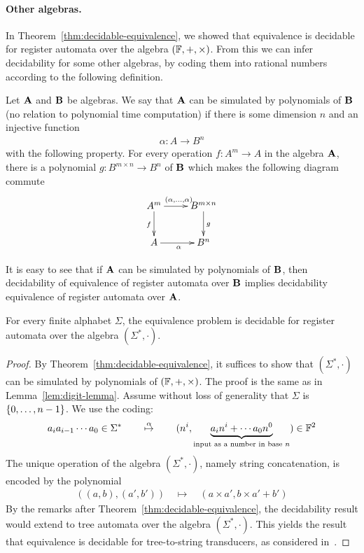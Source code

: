 \paragraph*{Other algebras.} In Theorem~\ref{thm:decidable-equivalence}, we showed that equivalence is decidable for register automata over the algebra $(\mathbb F,+,\times)$. From this we can infer decidability for  some other algebras, by coding them into rational numbers according to the following definition.

\begin{definition}
	Let $\mathbf A$ and $\mathbf B$ be algebras. We say that $\mathbf A$ can be  simulated  by polynomials of   $\mathbf B$ (no relation to polynomial time computation) if there is some dimension $n$ and an injective function
	\begin{align*}
  \alpha : A \to B^n
\end{align*}
with the following property. For every operation $f : A^m \to A$ in the algebra $\mathbf A$, there is a polynomial $g : B^{m \times n} \to B^n$ of $\mathbf B$ which makes the following diagram commute
\begin{align*}
  \xymatrix{A^{m} \ar[d]_f \ar[r]^{(\alpha,\ldots,\alpha)} & B^{m \times n} \ar[d]^g \\
  A \ar[r]_\alpha & B^{n}}
\end{align*}
\end{definition}
It is easy to see that if $\mathbf A$ can be simulated by polynomials of $\mathbf B$, then decidability of equivalence of register automata over $\mathbf B$ implies decidability  equivalence of register automata over $\mathbf A$. 
\begin{corollary}\label{cor:register-automata-equivalence} For every finite alphabet $\Sigma$, 	the equivalence problem is decidable for register automata over  the algebra $(\Sigma^*, \cdot)$.
\end{corollary}
\begin{proof} By Theorem~\ref{thm:decidable-equivalence}, 
	it suffices to show that $(\Sigma^*,\cdot)$ can be simulated by polynomials of $(\mathbb F,+,\times)$.
	The proof is the same as in Lemma~\ref{lem:digit-lemma}.
	 Assume without loss of generality that $\Sigma$ is $\{0,\ldots,n-1\}$. We use the  coding:  
	\begin{align*}
a_i a_{i-1} \cdots a_0 \in \Sigma^* \qquad \stackrel \alpha \mapsto \qquad   (n^i, \underbrace{a_i n^i + \cdots a_0 n^0}_{\text{input as a number in base $n$}}) \in \mathbb F^2
\end{align*}
The unique operation of the algebra $(\Sigma^*,\cdot)$, namely string concatenation, is encoded by the polynomial
\begin{align*}
  ((a,b),(a',b')) \quad \mapsto \quad (a \times a', b \times a' + b')
\end{align*}
By the remarks after Theorem~\ref{thm:decidable-equivalence}, the decidability result would extend to tree automata over the algebra $(\Sigma^*,\cdot)$. This  yields the result that equivalence is decidable for tree-to-string transducers, as considered in~\cite{Seidl:2015ik}.

\end{proof}



